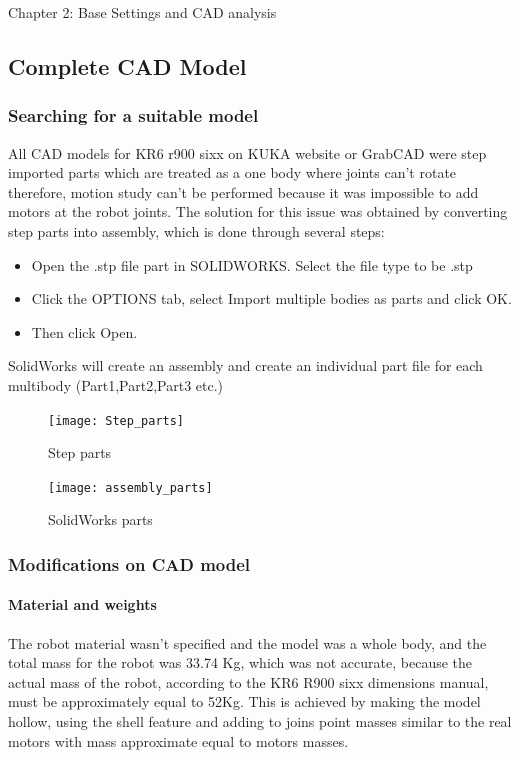 \documentclass{book}
\begin{document}
\begin{chapter}{Chapter 2: Base Settings and CAD analysis}
\subsection{Complete CAD Model}

\subsubsection{Searching for a suitable model}
All CAD models for KR6 r900 sixx on KUKA website or GrabCAD were step imported parts which are treated as a one body where joints can’t rotate therefore, motion study can’t be performed because it was impossible to add motors at the robot joints. The solution for this issue was obtained by converting step parts into assembly, which is done through several steps:
\begin{itemize}
	\item Open the .stp file part in SOLIDWORKS.  Select the file type to be .stp
	\item Click the OPTIONS tab, select Import multiple bodies as parts and click OK.
	\item Then click Open.
\end{itemize}
SolidWorks will create an assembly and create an individual part file for each multibody (Part1,Part2,Part3 etc.)
\begin{figure}[H]
	\centering
	\texttt{[image: Step\_parts]}
	\caption{Step parts}
\end{figure}

\begin{figure}[H]
	\centering
	\texttt{[image: assembly\_parts]}
	\caption{SolidWorks parts}
\end{figure}

\subsubsection{Modifications on CAD model}
\paragraph{Material and weights}
The robot material wasn’t specified and the model was a whole body, and the total mass for the robot was 33.74 Kg, which was not accurate, because the actual mass of the robot, according to the KR6 R900 sixx dimensions manual, must be approximately equal to 52Kg. This is achieved by making the model hollow, using the shell feature and adding to joins point masses similar to the real motors with mass approximate equal to motors masses. 


\end{chapter}
\end{document}
